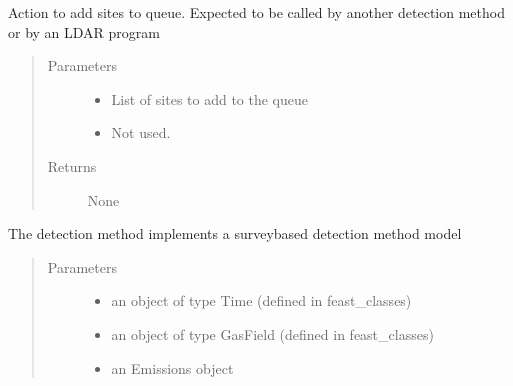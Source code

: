 \documentclass[letterpaper,10pt,english]{sphinxmanual}
\begin{document}
\begin{fulllineitems}
\begin{fulllineitems}
\label{\detokenize{index:feast.DetectionModules.site_survey.SiteSurvey.action}}
Action to add sites to queue. Expected to be called by another detection method or by an LDAR program
\begin{quote}\begin{description}
\item[{Parameters}] \leavevmode\begin{itemize}
\item {} 
 \textendash{} List of sites to add to the queue

\item {} 
 \textendash{} Not used.

\end{itemize}

\item[{Returns}] \leavevmode
None

\end{description}\end{quote}

\end{fulllineitems}


\begin{fulllineitems}
\label{\detokenize{index:feast.DetectionModules.site_survey.SiteSurvey.detect}}
The detection method implements a survey\sphinxhyphen{}based detection method model
\begin{quote}\begin{description}
\item[{Parameters}] \leavevmode\begin{itemize}
\item {} 
 \textendash{} an object of type Time (defined in feast\_classes)

\item {} 
 \textendash{} an object of type GasField (defined in feast\_classes)

\item {} 
 \textendash{} an Emissions object


\end{itemize}
\end{description}
\end{quote}
\end{fulllineitems}
\end{fulllineitems}
\end{document}
